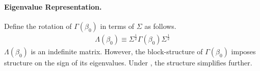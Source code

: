 \paragraph*{Eigenvalue Representation.}

Define the rotation of  \(\Gamma(\beta_0)\) in terms of \(\Sigma\)  as follows.
\begin{align}
\Lambda(\beta_0) \equiv 
\Sigma^{\frac{1}{2}} 
\Gamma(\beta_0)
\Sigma^{\frac{1}{2}}
\end{align}
\(\Lambda(\beta_0)\) is an indefinite matrix. However, the block-structure of \(\Gamma(\beta_0)\) imposes structure on the sign of its eigenvalues. Under , the structure simplifies further.
